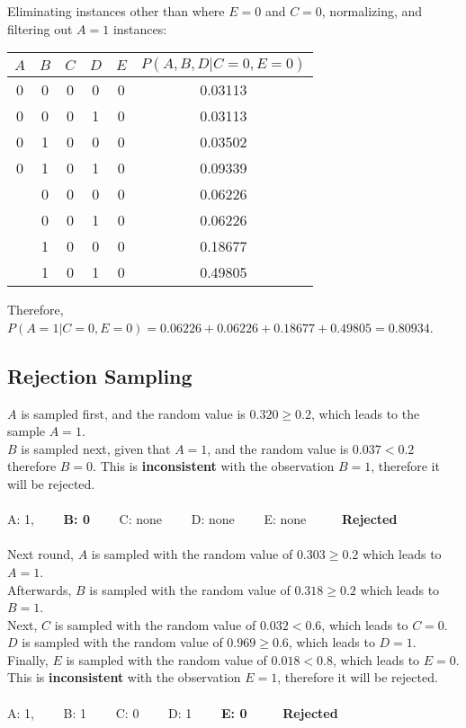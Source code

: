 \documentclass{homework}
\begin{document}
Eliminating instances other than where $E = 0$ and $C = 0$, normalizing, and filtering out $A = 1$ instances:

\begin{table}[h!]
    \centering
    \begin{tabular}{ccccc|c}
        $A$ & $B$ & $C$ & $D$ & $E$ & $P(A, B, D | C = 0, E = 0)$ \\
        \midrule
        0 & 0 & 0 & 0 & 0 & 0.03113 \\
        0 & 0 & 0 & 1 & 0 & 0.03113 \\
        0 & 1 & 0 & 0 & 0 & 0.03502 \\
        0 & 1 & 0 & 1 & 0 & 0.09339 \\
        \color{red}{1} & 0 & 0 & 0 & 0 & 0.06226 \\
        \color{red}{1} & 0 & 0 & 1 & 0 & 0.06226 \\
        \color{red}{1} & 1 & 0 & 0 & 0 & 0.18677 \\
        \color{red}{1} & 1 & 0 & 1 & 0 & 0.49805 \\
    \end{tabular}
\end{table}

Therefore, $P(A = 1 | C = 0, E = 0) = 0.06226 + 0.06226 + 0.18677 + 0.49805 = \mathbf{0.80934}$.

\clearpage
\exercise[3]
\subsection{Rejection Sampling}
$A$ is sampled first, and the random value is $0.320 \geq 0.2$, which leads to the sample $A = 1$.\\
$B$ is sampled next, given that $A = 1$, and the random value is $0.037 < 0.2$ therefore $B = 0$. This is \textbf{inconsistent} with the observation $B = 1$, therefore it will be rejected.\\\\
A: 1, \ \ \ \ \textbf{B: 0} \ \ \ \ C: none \ \ \ \ D: none \ \ \ \ E: none  \ \ \ \ \ \textbf{Rejected} \\ \\
Next round, $A$ is sampled with the random value of $0.303 \geq 0.2$ which leads to $A = 1$.\\
Afterwards, $B$ is sampled with the random value of $0.318 \geq 0.2$ which leads to $B = 1$.\\
Next, $C$ is sampled with the random value of $0.032 < 0.6$, which leads to $C = 0$.\\
$D$ is sampled with the random value of $0.969 \geq 0.6$, which leads to $D = 1$.\\
Finally, $E$ is sampled with the random value of $0.018 < 0.8$, which leads to $E = 0$. This is \textbf{inconsistent} with the observation $E = 1$, therefore it will be rejected.\\\\
A: 1, \ \ \ \ B: 1 \ \ \ \ C: 0 \ \ \ \ D: 1 \ \ \ \ \textbf{E: 0}  \ \ \ \ \ \textbf{Rejected}  \\ \\
\end{document}
